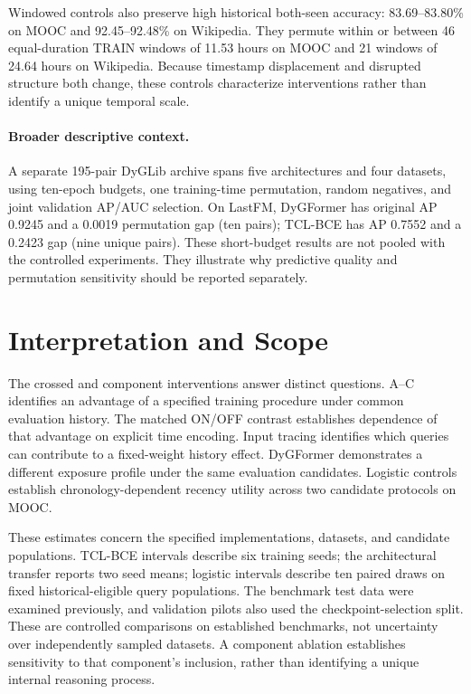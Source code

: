 \documentclass[sigconf,anonymous,review]{acmart}
\begin{document}
\begin{table}[t]
\centering\small
\caption{MOOC logistic training contrasts (points), with 95\% paired $t_9$ intervals over ten draws. H/R: historical/random negatives in both TRAIN and test. Queries are common across protocols; candidates are fixed within each chronology contrast.}
\label{tab:candidates}

\end{table}

Windowed controls also preserve high historical both-seen accuracy: 83.69--83.80\% on MOOC and 92.45--92.48\% on Wikipedia. They permute within or between 46 equal-duration TRAIN windows of 11.53 hours on MOOC and 21 windows of 24.64 hours on Wikipedia. Because timestamp displacement and disrupted structure both change, these controls characterize interventions rather than identify a unique temporal scale.

\paragraph{Broader descriptive context.}
A separate 195-pair DyGLib archive spans five architectures and four datasets, using ten-epoch budgets, one training-time permutation, random negatives, and joint validation AP/AUC selection. On LastFM, DyGFormer has original AP 0.9245 and a 0.0019 permutation gap (ten pairs); TCL-BCE has AP 0.7552 and a 0.2423 gap (nine unique pairs). These short-budget results are not pooled with the controlled experiments. They illustrate why predictive quality and permutation sensitivity should be reported separately.

\section{Interpretation and Scope}
The crossed and component interventions answer distinct questions. A--C identifies an advantage of a specified training procedure under common evaluation history. The matched ON/OFF contrast establishes dependence of that advantage on explicit time encoding. Input tracing identifies which queries can contribute to a fixed-weight history effect. DyGFormer demonstrates a different exposure profile under the same evaluation candidates. Logistic controls establish chronology-dependent recency utility across two candidate protocols on MOOC.

These estimates concern the specified implementations, datasets, and candidate populations. TCL-BCE intervals describe six training seeds; the architectural transfer reports two seed means; logistic intervals describe ten paired draws on fixed historical-eligible query populations. The benchmark test data were examined previously, and validation pilots also used the checkpoint-selection split. These are controlled comparisons on established benchmarks, not uncertainty over independently sampled datasets. A component ablation establishes sensitivity to that component's inclusion, rather than identifying a unique internal reasoning process.
\end{document}
